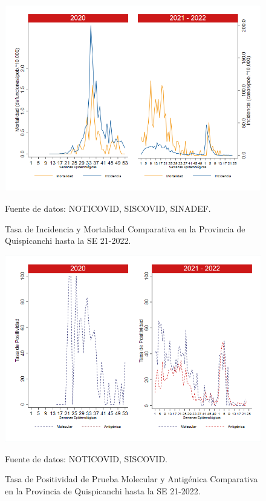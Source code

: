 \documentclass[12pt,a4paper,openany]{book}
\begin{document}
	\begin{figure}[h]
		\caption{Tasa de Incidencia y Mortalidad Comparativa en la Provincia de Quispicanchi hasta la SE 21-2022.}\label{fig:inc_mort_quisp}
		\begin{center}
			\includegraphics[width=0.85\linewidth]{../figuras/incidencia_mortalidad_20_21_12.png}
		\end{center}
		{\footnotesize {Fuente de datos: NOTICOVID, SISCOVID, SINADEF.}}
	\end{figure}
	
	\begin{figure}[h]
		\caption{Tasa de Positividad de Prueba Molecular y Antigénica Comparativa en la Provincia de Quispicanchi hasta la SE 21-2022.}\label{fig:positividad_quisp}
		\begin{center}
			\includegraphics[width=0.7\linewidth]{../figuras/positividad_20_21_12.png}
		\end{center}
		{\footnotesize {Fuente de datos: NOTICOVID, SISCOVID.}}
	\end{figure}
	
\end{document}
